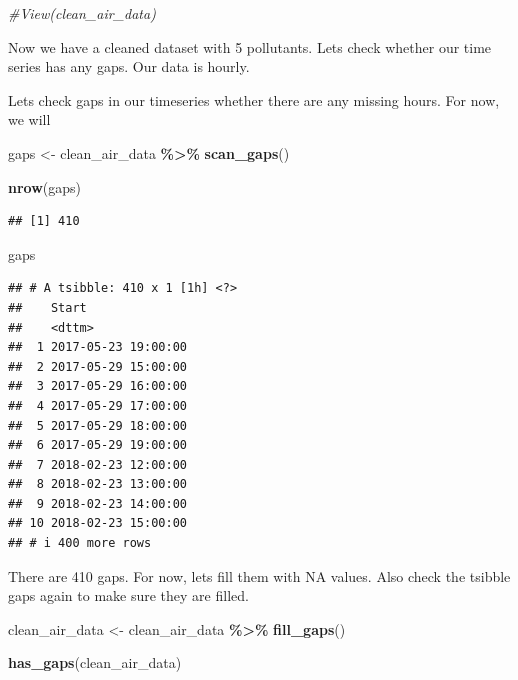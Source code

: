 \documentclass[
]{article}
\newenvironment{Shaded}{\begin{snugshade}}{\end{snugshade}}
\newcommand{\CommentTok}[1]{\textcolor[rgb]{0.56,0.35,0.01}{\textit{#1}}}
\newcommand{\FunctionTok}[1]{\textcolor[rgb]{0.13,0.29,0.53}{\textbf{#1}}}
\newcommand{\NormalTok}[1]{#1}
\newcommand{\OtherTok}[1]{\textcolor[rgb]{0.56,0.35,0.01}{#1}}
\newcommand{\SpecialCharTok}[1]{\textcolor[rgb]{0.81,0.36,0.00}{\textbf{#1}}}
\begin{document}
\begin{Shaded}
\begin{Highlighting}[]
\CommentTok{\#View(clean\_air\_data)}
\end{Highlighting}
\end{Shaded}

Now we have a cleaned dataset with 5 pollutants. Lets check whether our
time series has any gaps. Our data is hourly.

Lets check gaps in our timeseries whether there are any missing hours.
For now, we will

\begin{Shaded}
\begin{Highlighting}[]
\NormalTok{gaps }\OtherTok{\textless{}{-}}\NormalTok{ clean\_air\_data }\SpecialCharTok{\%\textgreater{}\%}
  \FunctionTok{scan\_gaps}\NormalTok{()}

\FunctionTok{nrow}\NormalTok{(gaps)}
\end{Highlighting}
\end{Shaded}

\begin{verbatim}
## [1] 410
\end{verbatim}

\begin{Shaded}
\begin{Highlighting}[]
\NormalTok{gaps}
\end{Highlighting}
\end{Shaded}

\begin{verbatim}
## # A tsibble: 410 x 1 [1h] <?>
##    Start              
##    <dttm>             
##  1 2017-05-23 19:00:00
##  2 2017-05-29 15:00:00
##  3 2017-05-29 16:00:00
##  4 2017-05-29 17:00:00
##  5 2017-05-29 18:00:00
##  6 2017-05-29 19:00:00
##  7 2018-02-23 12:00:00
##  8 2018-02-23 13:00:00
##  9 2018-02-23 14:00:00
## 10 2018-02-23 15:00:00
## # i 400 more rows
\end{verbatim}

There are 410 gaps. For now, lets fill them with NA values. Also check
the tsibble gaps again to make sure they are filled.

\begin{Shaded}
\begin{Highlighting}[]
\NormalTok{clean\_air\_data }\OtherTok{\textless{}{-}}\NormalTok{ clean\_air\_data }\SpecialCharTok{\%\textgreater{}\%}
  \FunctionTok{fill\_gaps}\NormalTok{()}

\FunctionTok{has\_gaps}\NormalTok{(clean\_air\_data)}
\end{Highlighting}
\end{Shaded}
\end{document}
